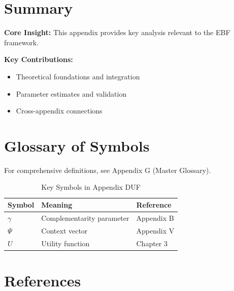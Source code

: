 \section{Summary}
\label{sec:duf-summary}

\begin{tcolorbox}[colback=gray!5!white, colframe=gray!75!black,
    title=Appendix duf Summary]

\textbf{Core Insight:}
This appendix provides key analysis relevant to the EBF framework.

\textbf{Key Contributions:}
\begin{itemize}[nosep]
    \item Theoretical foundations and integration
    \item Parameter estimates and validation
    \item Cross-appendix connections
\end{itemize}

\end{tcolorbox}

\section{Glossary of Symbols}
\label{sec:duf-glossary}

For comprehensive definitions, see Appendix G (Master Glossary).

\begin{table}[htbp]
\centering
\caption{Key Symbols in Appendix DUF}
\begin{tabular}{lll}
\toprule
\textbf{Symbol} & \textbf{Meaning} & \textbf{Reference} \\
\midrule
$\gamma$ & Complementarity parameter & Appendix B \\
$\Psi$ & Context vector & Appendix V \\
$U$ & Utility function & Chapter 3 \\
\bottomrule
\end{tabular}
\end{table}


\section{References}
\label{sec:duf-references}

